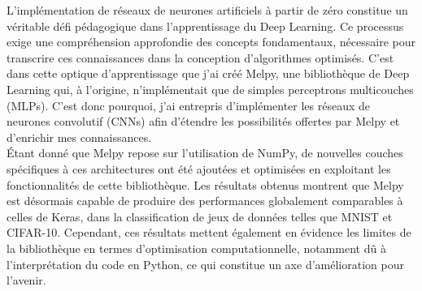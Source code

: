 L’implémentation de réseaux de neurones artificiels à partir de zéro constitue un véritable défi 
pédagogique dans l’apprentissage du Deep Learning. Ce processus exige une compréhension approfondie 
des concepts fondamentaux, nécessaire pour transcrire ces connaissances dans la conception d’algorithmes 
optimisés. C’est dans cette optique d'apprentissage que j’ai créé Melpy, une bibliothèque 
de Deep Learning qui, à l’origine, n’implémentait que de simples perceptrons multicouches\cite{MLP} (MLPs). C'est donc pourquoi, 
j’ai entrepris d’implémenter les réseaux de neurones convolutif (CNNs) afin d’étendre les possibilités offertes par 
Melpy et d’enrichir mes connaissances. \\


Étant donné que Melpy repose sur l’utilisation de NumPy, de nouvelles couches spécifiques à ces architectures 
ont été ajoutées et optimisées en exploitant les fonctionnalités de cette bibliothèque. Les résultats obtenus 
montrent que Melpy est désormais capable de produire des performances globalement comparables à celles de Keras, 
dans la classification de jeux de données telles que MNIST\cite{MNIST} et CIFAR-10\cite{CIFAR10}. Cependant, ces résultats mettent également 
en évidence les limites de la bibliothèque en termes d’optimisation computationnelle, notamment dû à l'interprétation
du code en Python, ce qui constitue un axe d'amélioration pour l'avenir.